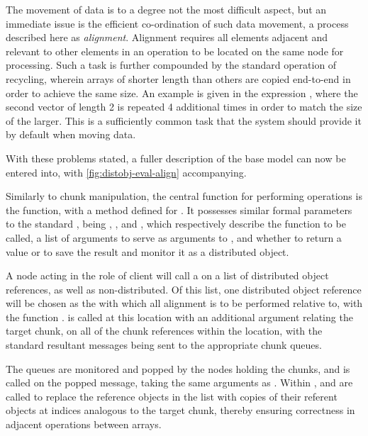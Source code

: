 The movement of data is to a degree not the most difficult aspect, but an immediate issue is the efficient co-ordination of such data movement, a process described here as \textit{alignment}.
Alignment requires all elements adjacent and relevant to other elements in an operation to be located on the same node for processing.
Such a task is further compounded by the standard operation of recycling, wherein arrays of shorter length than others are copied end-to-end in order to achieve the same size.
An example is given in the expression , where the second vector of length 2 is repeated 4 additional times in order to match the size of the larger.
This is a sufficiently common task that the system should provide it by default when moving data.

With these problems stated, a fuller description of the base model can now be entered into, with \cref{fig:distobj-eval-align} accompanying.


Similarly to chunk manipulation, the central function for performing operations is the  function, with a method defined for .
It possesses similar formal parameters to the standard , being , , and , which respectively describe the function to be called, a list of arguments to serve as arguments to , and whether to return a value or to save the result and monitor it as a distributed object.

A node acting in the role of client will call a  on a list of distributed object references, as well as non-distributed.
Of this list, one distributed object reference will be chosen as the  with which all alignment is to be performed relative to, with the function .
 is called at this location with an additional  argument relating the target chunk, on all of the chunk references within the location, with the standard resultant messages being sent to the appropriate chunk queues.

The queues are monitored and popped by the nodes holding the chunks, and  is called on the popped message, taking the same arguments as .
Within ,  and  are called to replace the reference objects in the  list with copies of their referent objects at indices analogous to the target chunk, thereby ensuring correctness in adjacent operations between arrays.

